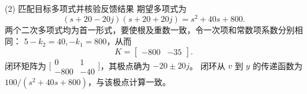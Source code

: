 \documentclass[11pt]{article}
\begin{document}
\begin{solution}
\begin{proofstep}{(2) 匹配目标多项式并核验反馈结果}
期望多项式为
\[
(s+20-20j)(s+20+20j)=s^2+40s+800.
\]
两个二次多项式均为首一形式，要使根及重数一致，令一次项和常数项系数分别相同：
$5-k_2=40,-k_1=800$，从而
\[
\boxed{K=\begin{bmatrix}-800&-35\end{bmatrix}.}
\]
闭环矩阵为 $\bigl[\begin{smallmatrix}0&1\\-800&-40\end{smallmatrix}\bigr]$，其极点确为 $-20\pm20j$。
闭环从 $v$ 到 $y$ 的传递函数为 $100/(s^2+40s+800)$，与该极点计算一致。
\end{proofstep}
\end{solution}
\end{document}
